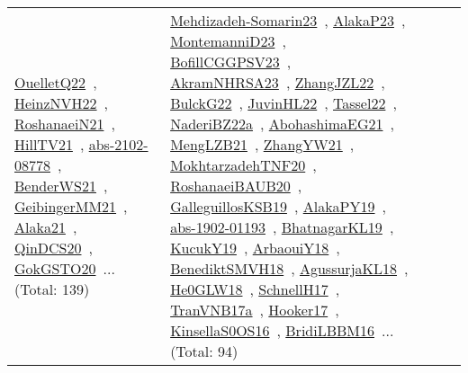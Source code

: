 {\begin{longtable}{lp{3cm}>{\raggedright\arraybackslash}p{6cm}>{\raggedright\arraybackslash}p{6cm}>{\raggedright\arraybackslash}p{8cm}}
\href{../works/OuelletQ22.pdf}{OuelletQ22}~\cite{OuelletQ22}, \href{../works/HeinzNVH22.pdf}{HeinzNVH22}~\cite{HeinzNVH22}, \href{../works/RoshanaeiN21.pdf}{RoshanaeiN21}~\cite{RoshanaeiN21}, \href{../works/HillTV21.pdf}{HillTV21}~\cite{HillTV21}, \href{../works/abs-2102-08778.pdf}{abs-2102-08778}~\cite{abs-2102-08778}, \href{../works/BenderWS21.pdf}{BenderWS21}~\cite{BenderWS21}, \href{../works/GeibingerMM21.pdf}{GeibingerMM21}~\cite{GeibingerMM21}, \href{../works/Alaka21.pdf}{Alaka21}~\cite{Alaka21}, \href{../works/QinDCS20.pdf}{QinDCS20}~\cite{QinDCS20}, \href{../works/GokGSTO20.pdf}{GokGSTO20}~\cite{GokGSTO20}... (Total: 139) & \href{../works/Mehdizadeh-Somarin23.pdf}{Mehdizadeh-Somarin23}~\cite{Mehdizadeh-Somarin23}, \href{../works/AlakaP23.pdf}{AlakaP23}~\cite{AlakaP23}, \href{../works/MontemanniD23.pdf}{MontemanniD23}~\cite{MontemanniD23}, \href{../works/BofillCGGPSV23.pdf}{BofillCGGPSV23}~\cite{BofillCGGPSV23}, \href{../works/AkramNHRSA23.pdf}{AkramNHRSA23}~\cite{AkramNHRSA23}, \href{../works/ZhangJZL22.pdf}{ZhangJZL22}~\cite{ZhangJZL22}, \href{../works/BulckG22.pdf}{BulckG22}~\cite{BulckG22}, \href{../works/JuvinHL22.pdf}{JuvinHL22}~\cite{JuvinHL22}, \href{../works/Tassel22.pdf}{Tassel22}~\cite{Tassel22}, \href{../works/NaderiBZ22a.pdf}{NaderiBZ22a}~\cite{NaderiBZ22a}, \href{../works/AbohashimaEG21.pdf}{AbohashimaEG21}~\cite{AbohashimaEG21}, \href{../works/MengLZB21.pdf}{MengLZB21}~\cite{MengLZB21}, \href{../works/ZhangYW21.pdf}{ZhangYW21}~\cite{ZhangYW21}, \href{../works/MokhtarzadehTNF20.pdf}{MokhtarzadehTNF20}~\cite{MokhtarzadehTNF20}, \href{../works/RoshanaeiBAUB20.pdf}{RoshanaeiBAUB20}~\cite{RoshanaeiBAUB20}, \href{../works/GalleguillosKSB19.pdf}{GalleguillosKSB19}~\cite{GalleguillosKSB19}, \href{../works/AlakaPY19.pdf}{AlakaPY19}~\cite{AlakaPY19}, \href{../works/abs-1902-01193.pdf}{abs-1902-01193}~\cite{abs-1902-01193}, \href{../works/BhatnagarKL19.pdf}{BhatnagarKL19}~\cite{BhatnagarKL19}, \href{../works/KucukY19.pdf}{KucukY19}~\cite{KucukY19}, \href{../works/ArbaouiY18.pdf}{ArbaouiY18}~\cite{ArbaouiY18}, \href{../works/BenediktSMVH18.pdf}{BenediktSMVH18}~\cite{BenediktSMVH18}, \href{../works/AgussurjaKL18.pdf}{AgussurjaKL18}~\cite{AgussurjaKL18}, \href{../works/He0GLW18.pdf}{He0GLW18}~\cite{He0GLW18}, \href{../works/SchnellH17.pdf}{SchnellH17}~\cite{SchnellH17}, \href{../works/TranVNB17a.pdf}{TranVNB17a}~\cite{TranVNB17a}, \href{../works/Hooker17.pdf}{Hooker17}~\cite{Hooker17}, \href{../works/KinsellaS0OS16.pdf}{KinsellaS0OS16}~\cite{KinsellaS0OS16}, \href{../works/BridiLBBM16.pdf}{BridiLBBM16}~\cite{BridiLBBM16}... (Total: 94)\\

\end{longtable}}
